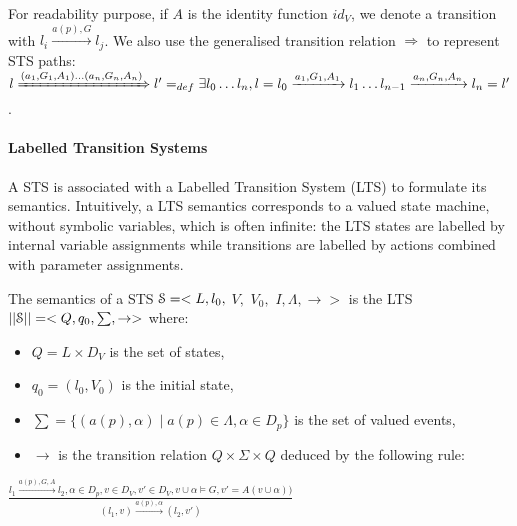 For readability purpose, if $A$ is the identity function $id_V$,
we denote a transition with $l_i \xrightarrow{a(p),G} l_j$. We
also use the generalised transition relation $\Rightarrow$ to
represent STS paths: $l \xRightarrow{(a_1,G_1,A_1)\dots
(a_n,G_n,A_n)} l' =_{def} \exists l_0\dots l_n, l=l_0
\xrightarrow{a_1,G_1,A_1} l_1\dots
l_{n-1}\xrightarrow{a_n,G_n,A_n}l_n=l'$.

\paragraph{Labelled Transition Systems}
\label{sec:definitions:lts}

A STS is associated with a Labelled Transition System (LTS) to
formulate its semantics. Intuitively, a LTS semantics corresponds
to a valued state machine, without symbolic variables, which is
often infinite: the LTS states are labelled by internal variable
assignments while transitions are labelled by actions combined
with parameter assignments.

\begin{definition}
    The semantics of a STS $\EuScript{S}=<L,l_0,$ $V,$ $V_0,$
    $I,\Lambda,\rightarrow>$ is the LTS
    $||\EuScript{S}||=<Q,q_0,\sum,\rightarrow>$ where:

	\begin{itemize}

		\item $Q=L \times D_V$ is the set of states,

        \item $q_0=(l_0,V_0)$ is the initial state,

		\item $\sum=\{(a(p),\alpha)  \mid  a(p)\in\Lambda, \alpha \in
		D_p\}$ is the set of valued events,

        \item $\rightarrow$ is the transition relation $Q \times
        \Sigma \times Q$ deduced by the following rule:\\
	\end{itemize}
	\begin{center}
    $\frac{l_1 \xrightarrow{a(p),G,A}l_2,\alpha \in D_p, v \in D_V, v'
        \in D_V, v \cup \alpha \models G, v'=A(v \cup \alpha))}{(l_1,v)
            \xrightarrow{a(p),\alpha} (l_2,v') }$
	\end{center}

	\label{def:semantics}
\end{definition}

